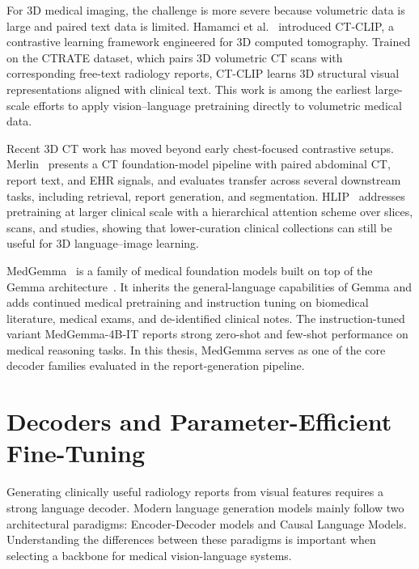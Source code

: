 For 3D medical imaging, the challenge is more severe because volumetric data is large and paired text data is limited. Hamamci et al.~\cite{hamamci2024foundation} introduced CT-CLIP, a contrastive learning framework engineered for 3D computed tomography. Trained on the \ac{CTRATE} dataset, which pairs 3D volumetric CT scans with corresponding free-text radiology reports, CT-CLIP learns 3D structural visual representations aligned with clinical text. This work is among the earliest large-scale efforts to apply vision--language pretraining directly to volumetric medical data.

Recent 3D CT work has moved beyond early chest-focused contrastive setups. Merlin~\cite{Blankemeier_2026} presents a CT foundation-model pipeline with paired abdominal CT, report text, and \ac{EHR} signals, and evaluates transfer across several downstream tasks, including retrieval, report generation, and segmentation. HLIP~\cite{zhao2026scalablelanguageimagepretraining3d} addresses pretraining at larger clinical scale with a hierarchical attention scheme over slices, scans, and studies, showing that lower-curation clinical collections can still be useful for 3D language--image learning.

MedGemma~\cite{yang2024medgemma} is a family of medical foundation models built on top of the Gemma architecture~\cite{team2024gemma}. It inherits the general-language capabilities of Gemma and adds continued medical pretraining and instruction tuning on biomedical literature, medical exams, and de-identified clinical notes. The instruction-tuned variant MedGemma-4B-IT reports strong zero-shot and few-shot performance on medical reasoning tasks. In this thesis, MedGemma serves as one of the core decoder families evaluated in the report-generation pipeline.

\section{Decoders and Parameter-Efficient Fine-Tuning}\label{sec:rw_llm}

Generating clinically useful radiology reports from visual features requires a strong language decoder. Modern language generation models mainly follow two architectural paradigms: Encoder-Decoder models and Causal Language Models. Understanding the differences between these paradigms is important when selecting a backbone for medical vision-language systems.

